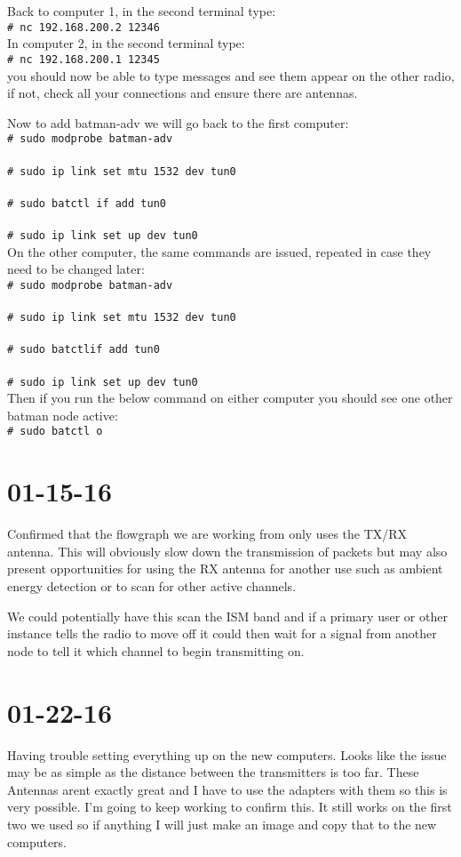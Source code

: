 \documentclass{article}
\newcommand{\shellcmd}[1]{\\\indent\indent\texttt{\footnotesize\# #1}\\}
\begin{document}
{	Back to computer 1, in the second terminal type:
	\shellcmd{nc 192.168.200.2 12346}

	In computer 2, in the second terminal type:
	\shellcmd{nc 192.168.200.1 12345}

	you should now be able to type messages and see them appear on the other radio, if not, check all your connections and ensure there are antennas. 

	Now to add batman-adv we will go back to the first computer:
	\shellcmd{sudo modprobe batman-adv}
	\shellcmd{sudo ip link set mtu 1532 dev tun0}
	\shellcmd{sudo batctl if add tun0}
	\shellcmd{sudo ip link set up dev tun0}

	On the other computer, the same commands are issued, repeated in case they need to be changed later:
	\shellcmd{sudo modprobe batman-adv}
	\shellcmd{sudo ip link set mtu 1532 dev tun0}
	\shellcmd{sudo batctlif add tun0}
	\shellcmd{sudo ip link set up dev tun0}

	Then if you run the below command on either computer you should see one other batman node active:
	\shellcmd{sudo batctl o}

	\section{01-15-16}
		
	Confirmed that the flowgraph we are working from only uses the TX/RX antenna. This will obviously slow down the transmission of packets but may also present opportunities for using
	the RX antenna for another use such as ambient energy detection or to scan for other active channels. 

	We could potentially have this scan the ISM band and if a primary user or other instance tells the radio to move off it could then wait for a signal from another node to tell it
	which channel to begin transmitting on. 
	
	\section{01-22-16}

	Having trouble setting everything up on the new computers. Looks like the issue may be as simple as the distance between the transmitters is too far. These Antennas arent exactly great and I
	have to use the adapters with them so this is very possible. I'm going to keep working to confirm this. It still works on the first two we used so if anything I will just make an image and copy
	that to the new computers.


}
\end{document}
